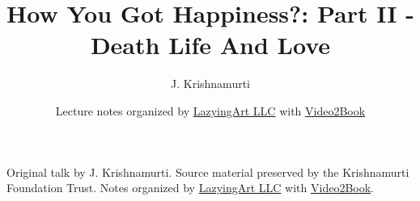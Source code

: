 \documentclass[11pt,oneside]{book}
\begin{document}
\frontmatter
\title{How You Got Happiness?: Part II - Death Life And Love}
\author{J. Krishnamurti}
\date{Lecture notes organized by \href{https://lazying.art}{LazyingArt LLC} with \href{https://github.com/lachlanchen/Video2Book}{Video2Book}}
\maketitle
\begin{center}
\small Original talk by J. Krishnamurti. Source material preserved by the Krishnamurti Foundation Trust. Notes organized by \href{https://lazying.art}{LazyingArt LLC} with \href{https://github.com/lachlanchen/Video2Book}{Video2Book}.
\end{center}
\clearpage
\mainmatter

\end{document}
